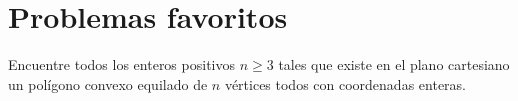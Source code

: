 \chapter{Problemas favoritos}
\begin{problem}
Encuentre todos los enteros positivos $n\geq3$ tales que existe
en el plano cartesiano un polígono convexo equilado de $n$ vértices todos
con coordenadas enteras.
\end{problem}
